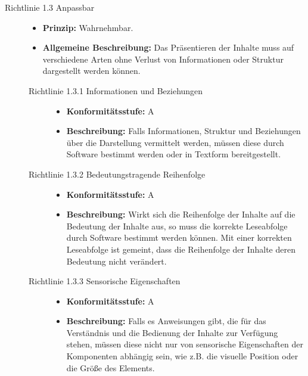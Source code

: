 \begin{description}
\begin{description}
	\end{description}

	\item[Richtlinie 1.3 Anpassbar]\hfill
	\begin{itemize}
		\item \textbf{Prinzip:} Wahrnehmbar.
		\item \textbf{Allgemeine Beschreibung:} Das Präsentieren der Inhalte muss auf verschiedene Arten ohne Verlust von Informationen oder 
		Struktur dargestellt werden können.
	\end{itemize}
	
	\begin{description}
		\item[Richtlinie 1.3.1 Informationen und Beziehungen]\hfill
		\begin{itemize}
			\item \textbf{Konformitätsstufe:} A
			\item \textbf{Beschreibung:} Falls Informationen, Struktur und Beziehungen über die Darstellung vermittelt werden, müssen diese durch Software bestimmt 
			werden oder in Textform bereitgestellt.
		\end{itemize}
			
		\item[Richtlinie 1.3.2 Bedeutungstragende Reihenfolge]\hfill
		\begin{itemize}
			\item \textbf{Konformitätsstufe:} A
			\item \textbf{Beschreibung:} Wirkt sich die Reihenfolge der Inhalte auf die Bedeutung der Inhalte aus, so muss die korrekte Leseabfolge durch Software 
			bestimmt werden können. Mit einer korrekten Leseabfolge ist gemeint, dass die Reihenfolge der Inhalte deren Bedeutung nicht verändert.
		\end{itemize}
			
		\item[Richtlinie 1.3.3 Sensorische Eigenschaften]\hfill
		\begin{itemize}
			\item \textbf{Konformitätsstufe:} A
			\item \textbf{Beschreibung:} Falls es Anweisungen gibt, die für das Verständnis und die Bedienung der Inhalte zur Verfügung stehen, müssen diese 
			nicht nur von sensorische Eigenschaften der Komponenten abhängig sein, wie z.B. die visuelle Position oder die Größe des Elements.
		\end{itemize}
	\end{description}


\end{description}
